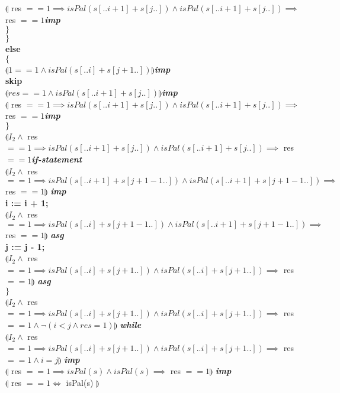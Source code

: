 \documentclass[12pt]{article}
\begin{document}
\hspace*{20mm}$\limg$ res $== 1  \implies isPal(s[..i+1]+s[j..]) \land isPal(s[..i+1]+s[j..]) \implies $ res $==1$\textit{\textbf{imp}}\\
\hspace*{10mm}\textbf{$\}$} \\
\hspace*{10mm}\textbf{$\}$} \\
\hspace*{10mm}\textbf{else} \\
\hspace*{10mm}\textbf{$\{$} \\
\hspace*{20mm}$\limg 1==1 \land isPal(s[..i]+s[j+1..]) \rimg$\textit{\textbf{imp}}\\
\hspace*{20mm}\textbf{skip} \\
\hspace*{20mm}$\limg res==1 \land isPal(s[..i+1]+s[j..]) \rimg$\textit{\textbf{imp}}\\
\hspace*{20mm}$\limg$ res $== 1  \implies isPal(s[..i+1]+s[j..]) \land isPal(s[..i+1]+s[j..]) \implies $ res $==1$\textit{\textbf{imp}}\\
\hspace*{10mm}\textbf{$\}$} \\
\hspace*{10mm}$\limg I_2 \land$ res $== 1  \implies isPal(s[..i+1]+s[j..]) \land isPal(s[..i+1]+s[j..]) \implies $ res $==1$\textit{\textbf{if-statement}}\\
\hspace*{10mm}$\limg I_2 \land$ res $== 1  \implies isPal(s[..i+1]+s[j+1-1..]) \land isPal(s[..i+1]+s[j+1-1..]) \implies $ res $==1 \rimg$ \textit{\textbf{imp}}\\
\hspace*{10mm}\textbf{i := i + 1;} \\
\hspace*{10mm}$\limg I_2 \land$ res $== 1  \implies isPal(s[..i]+s[j+1-1..]) \land isPal(s[..i+1]+s[j+1-1..]) \implies $ res $==1 \rimg$ \textit{\textbf{asg}}\\
\hspace*{10mm}\textbf{j := j - 1;} \\
\hspace*{10mm}$\limg I_2 \land$ res $== 1  \implies isPal(s[..i]+s[j+1..]) \land isPal(s[..i]+s[j+1..]) \implies $ res $==1 \rimg$ \textit{\textbf{asg}}\\
\textbf{$\}$} \\
$\limg I_2 \land$ res $== 1  \implies isPal(s[..i]+s[j+1..]) \land isPal(s[..i]+s[j+1..]) \implies $ res $==1 \land \neg(i < j \land res = 1) \rimg$ \textbf{\textit{while}}\\ 
$\limg I_2 \land$ res $== 1  \implies isPal(s[..i]+s[j+1..]) \land isPal(s[..i]+s[j+1..]) \implies $ res $==1 \land i = j \rimg$ \textbf{\textit{imp}}\\ 
$\limg$ res $== 1  \implies isPal(s) \land isPal(s) \implies $ res $==1 \rimg$ \textbf{\textit{imp}}\\ 
$\limg$ res $==1 \iff$ isPal(s) $\rimg$
\newpage
\end{document}
